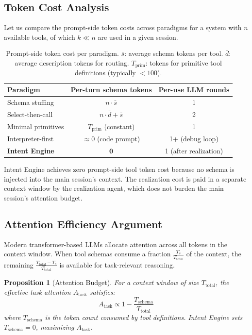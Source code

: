 \documentclass[11pt]{article}
\newtheorem{proposition}{Proposition}
\begin{document}
\subsection{Token Cost Analysis}
\label{sec:token-analysis}

Let us compare the prompt-side token costs across paradigms for a system with $n$ available tools, of which $k \ll n$ are used in a given session.

\begin{table}[h]
\centering
\caption{Prompt-side token cost per paradigm. $\bar{s}$: average schema tokens per tool. $\bar{d}$: average description tokens for routing. $T_{\text{prim}}$: tokens for primitive tool definitions (typically $<100$).}
\label{tab:token-cost}
\begin{tabular}{lcc}
\toprule
\textbf{Paradigm} & \textbf{Per-turn schema tokens} & \textbf{Per-use LLM rounds} \\
\midrule
Schema stuffing & $n \cdot \bar{s}$ & 1 \\
Select-then-call & $n \cdot \bar{d} + \bar{s}$ & 2 \\
Minimal primitives & $T_{\text{prim}}$ (constant) & 1 \\
Interpreter-first & $\approx 0$ (code prompt) & 1+ (debug loop) \\
\textbf{Intent Engine} & $\mathbf{0}$ & 1 (after realization) \\
\bottomrule
\end{tabular}
\end{table}

Intent Engine achieves zero prompt-side tool token cost because no schema is injected into the main session's context.
The realization cost is paid in a separate context window by the realization agent, which does not burden the main session's attention budget.

\subsection{Attention Efficiency Argument}
\label{sec:attention}

Modern transformer-based LLMs allocate attention across all tokens in the context window.
When tool schemas consume a fraction $\frac{T_s}{T_{\text{total}}}$ of the context, the remaining $\frac{T_{\text{total}} - T_s}{T_{\text{total}}}$ is available for task-relevant reasoning.

\begin{proposition}[Attention Budget]
For a context window of size $T_{\text{total}}$, the effective task attention $A_{\text{task}}$ satisfies:
\[
A_{\text{task}} \propto 1 - \frac{T_{\text{schema}}}{T_{\text{total}}}
\]
where $T_{\text{schema}}$ is the token count consumed by tool definitions.
Intent Engine sets $T_{\text{schema}} = 0$, maximizing $A_{\text{task}}$.
\end{proposition}
\end{document}
